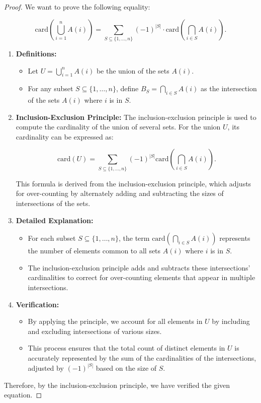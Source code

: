 \begin{proof}
  \leanok
  We want to prove the following equality:

  \[
  \text{card} \left( \bigcup_{i=1}^n A(i) \right) = \sum_{S \subseteq \{1, \ldots, n\}} (-1)^{|S|} \cdot \text{card} \left( \bigcap_{i \in S} A(i) \right).
  \]

  \begin{enumerate}
    \item \textbf{Definitions:}
    \begin{itemize}
        \item Let \( U = \bigcup_{i=1}^n A(i) \) be the union of the sets \( A(i) \).
        \item For any subset \( S \subseteq \{1, \ldots, n\} \), define \( B_S = \bigcap_{i \in S} A(i) \) as the intersection of the sets \( A(i) \) where \( i \) is in \( S \).
    \end{itemize}

    \item \textbf{Inclusion-Exclusion Principle:}
    The inclusion-exclusion principle is used to compute the cardinality of the union of several sets. For the union \( U \), its cardinality can be expressed as:

    \[
    \text{card}(U) = \sum_{S \subseteq \{1, \ldots, n\}} (-1)^{|S|} \text{card} \left( \bigcap_{i \in S} A(i) \right).
    \]

    This formula is derived from the inclusion-exclusion principle, which adjusts for over-counting by alternately adding and subtracting the sizes of intersections of the sets.

    \item \textbf{Detailed Explanation:}
    \begin{itemize}
        \item For each subset \( S \subseteq \{1, \ldots, n\} \), the term \( \text{card} \left( \bigcap_{i \in S} A(i) \right) \) represents the number of elements common to all sets \( A(i) \) where \( i \) is in \( S \).
        \item The inclusion-exclusion principle adds and subtracts these intersections' cardinalities to correct for over-counting elements that appear in multiple intersections.
    \end{itemize}

    \item \textbf{Verification:}
    \begin{itemize}
        \item By applying the principle, we account for all elements in \( U \) by including and excluding intersections of various sizes.
        \item This process ensures that the total count of distinct elements in \( U \) is accurately represented by the sum of the cardinalities of the intersections, adjusted by \( (-1)^{|S|} \) based on the size of \( S \).
    \end{itemize}
\end{enumerate}

Therefore, by the inclusion-exclusion principle, we have verified the given equation.
\end{proof}